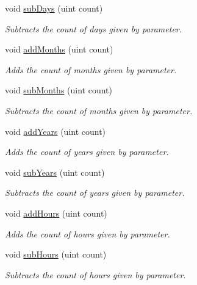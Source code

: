 \begin{DoxyCompactItemize}
void \mbox{\hyperlink{class_date_time_a8b49589808773b2bb330bc5414deae76}{sub\+Days}} (uint count)
\begin{DoxyCompactList}\small\item\em Subtracts the count of days given by parameter. \end{DoxyCompactList}\item 
void \mbox{\hyperlink{class_date_time_a07122467e69f11dd79a615af9c5097d1}{add\+Months}} (uint count)
\begin{DoxyCompactList}\small\item\em Adds the count of months given by parameter. \end{DoxyCompactList}\item 
void \mbox{\hyperlink{class_date_time_a2030620c1d44592ee63d92a7f1161c26}{sub\+Months}} (uint count)
\begin{DoxyCompactList}\small\item\em Subtracts the count of months given by parameter. \end{DoxyCompactList}\item 
void \mbox{\hyperlink{class_date_time_a831ab5e9d50c8157ee0c23dc292b8ef5}{add\+Years}} (uint count)
\begin{DoxyCompactList}\small\item\em Adds the count of years given by parameter. \end{DoxyCompactList}\item 
void \mbox{\hyperlink{class_date_time_a94bd3c5a6d9875368ba1795dedac8588}{sub\+Years}} (uint count)
\begin{DoxyCompactList}\small\item\em Subtracts the count of years given by parameter. \end{DoxyCompactList}\item 
void \mbox{\hyperlink{class_date_time_aa4ba03bfc47a41d0fcbf5087908fe7ab}{add\+Hours}} (uint count)
\begin{DoxyCompactList}\small\item\em Adds the count of hours given by parameter. \end{DoxyCompactList}\item 
void \mbox{\hyperlink{class_date_time_ad8731709f4f22cc39dd40b7facdbe058}{sub\+Hours}} (uint count)
\begin{DoxyCompactList}\small\item\em Subtracts the count of hours given by parameter. \end{DoxyCompactList}\item 

\end{DoxyCompactItemize}
